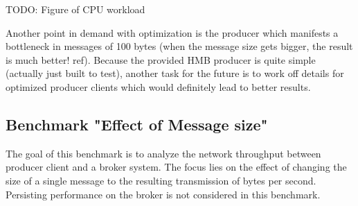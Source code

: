 TODO: Figure of CPU workload

Another point in demand with optimization is the producer which manifests a
bottleneck in messages of 100 bytes (when the message size gets bigger, the
result is much better! ref). Because the provided HMB producer is quite simple
(actually just built to test), another task for the future is to work off details for
optimized producer clients which would definitely lead to better results. 

\newpage
\subsection{Benchmark "Effect of Message size"}
\label{sec:conc-benchmark-2}
The goal of this benchmark is to analyze the network throughput between
producer client and a broker system. The focus lies on the effect of changing the
size of a single message to the resulting transmission of bytes per
second. Persisting performance on the broker is not considered in
this benchmark.

